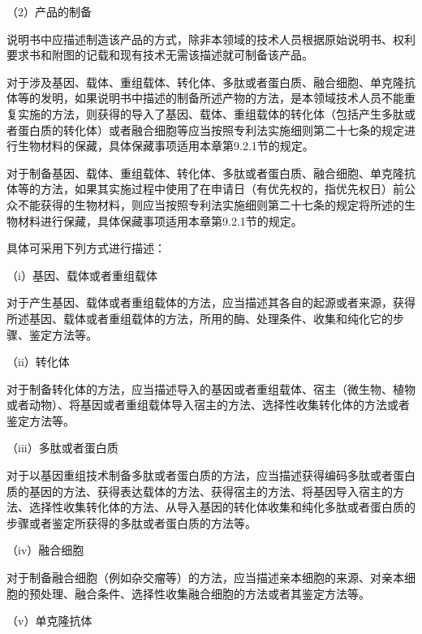 {\setlength{\parindent}{17.1bp}（2）产品的制备\par}

说明书中应描述制造该产品的方式，除非本领域的技术人员根据原始说明书、权利要求书和附图的记载和现有技术无需该描述就可制备该产品。

对于涉及基因、载体、重组载体、转化体、多肽或者蛋白质、融合细胞、单克隆抗体等的发明，如果说明书中描述的制备所述产物的方法，是本领域技术人员不能重复实施的方法，则获得的导入了基因、载体、重组载体的转化体（包括产生多肽或者蛋白质的转化体）或者融合细胞等应当按照专利法实施细则第二十七条的规定进行生物材料的保藏，具体保藏事项适用本章第9.2.1节的规定。

对于制备基因、载体、重组载体、转化体、多肽或者蛋白质、融合细胞、单克隆抗体等的方法，如果其实施过程中使用了在申请日（有优先权的，指优先权日）前公众不能获得的生物材料，则应当按照专利法实施细则第二十七条的规定将所述的生物材料进行保藏，具体保藏事项适用本章第9.2.1节的规定。

具体可采用下列方式进行描述：

{\setlength{\parindent}{17.1bp}（i）基因、载体或者重组载体\par}

对于产生基因、载体或者重组载体的方法，应当描述其各自的起源或者来源，获得所述基因、载体或者重组载体的方法，所用的酶、处理条件、收集和纯化它的步骤、鉴定方法等。

{\setlength{\parindent}{17.1bp}（ii）转化体\par}

对于制备转化体的方法，应当描述导入的基因或者重组载体、宿主（微生物、植物或者动物）、将基因或者重组载体导入宿主的方法、选择性收集转化体的方法或者鉴定方法等。

{\setlength{\parindent}{17.1bp}（iii）多肽或者蛋白质\par}

对于以基因重组技术制备多肽或者蛋白质的方法，应当描述获得编码多肽或者蛋白质的基因的方法、获得表达载体的方法、获得宿主的方法、将基因导入宿主的方法、选择性收集转化体的方法、从导入基因的转化体收集和纯化多肽或者蛋白质的步骤或者鉴定所获得的多肽或者蛋白质的方法等。

{\setlength{\parindent}{17.1bp}（iv）融合细胞\par}

对于制备融合细胞（例如杂交瘤等）的方法，应当描述亲本细胞的来源、对亲本细胞的预处理、融合条件、选择性收集融合细胞的方法或者其鉴定方法等。

{\setlength{\parindent}{17.1bp}（v）单克隆抗体\par}

